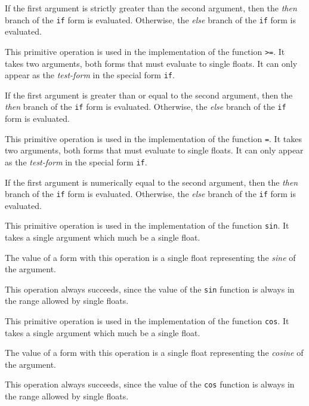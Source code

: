 If the first argument is strictly greater than the second argument,
then the \emph{then} branch of the \texttt{if} form is evaluated.
Otherwise, the \emph{else} branch of the \texttt{if} form is
evaluated.


This primitive operation is used in the implementation of the
\commonlisp{} function \texttt{>=}.  It takes two arguments, both forms
that must evaluate to single floats.  It can only appear as the
\emph{test-form} in the special form \texttt{if}.

If the first argument is greater than or equal to the second argument,
then the \emph{then} branch of the \texttt{if} form is evaluated.
Otherwise, the \emph{else} branch of the \texttt{if} form is
evaluated.


This primitive operation is used in the implementation of the
\commonlisp{} function \texttt{=}.  It takes two arguments, both forms
that must evaluate to single floats.  It can only appear as the
\emph{test-form} in the special form \texttt{if}.

If the first argument is numerically equal to the second argument,
then the \emph{then} branch of the \texttt{if} form is evaluated.
Otherwise, the \emph{else} branch of the \texttt{if} form is
evaluated.


This primitive operation is used in the implementation of the
\commonlisp{} function \texttt{sin}.  It takes a single argument which
much be a single float.

The value of a form with this operation is a single float representing
the \emph{sine} of the argument.

This operation always succeeds, since the value of the \texttt{sin}
function is always in the range allowed by single floats.


This primitive operation is used in the implementation of the
\commonlisp{} function \texttt{cos}.  It takes a single argument which
much be a single float.

The value of a form with this operation is a single float representing
the \emph{cosine} of the argument.

This operation always succeeds, since the value of the \texttt{cos}
function is always in the range allowed by single floats.

